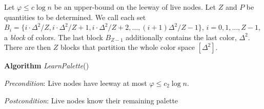 %
Let $\varphi \le c\log n$ be an upper-bound on the leeway of live nodes.
Let $Z$ and $P$ be quantities to be determined.
We call each set $B_i = \{i\cdot \Delta^2/Z, i\cdot \Delta^2/Z+1, i\cdot \Delta^2/Z+2, \ldots, (i+1)\Delta^2/Z-1 \}$, $i=0,1,\ldots, Z-1$, a \emph{block} of colors. The last block $B_{Z-1}$ additionally contains the last color, $\Delta^2$. 
There are then $Z$ blocks %
that partition the whole color space $[\Delta^2]$.

\medskip

   \textbf{Algorithm} \emph{LearnPalette}()
   
    \emph{Precondition}: Live nodes have leeway at most $\varphi \le c_2\log n$.

  \emph{Postcondition}: Live nodes know their remaining palette

